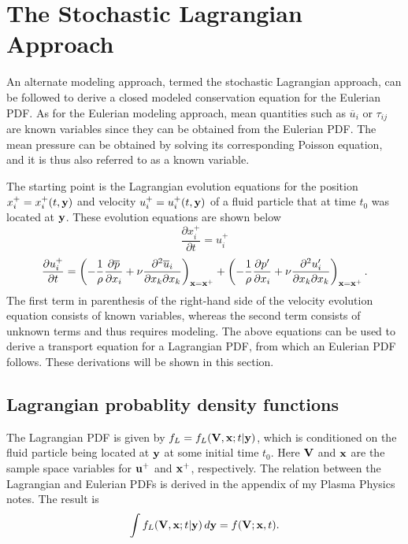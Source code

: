 \documentclass[oneside,a4paper,11pt]{report}
\newcommand{\pavg}{\overline{p}}
\newcommand{\uavg}{\overline{u}}
\newcommand{\pfluc}{p'}
\newcommand{\ufluc}{u'}
\newcommand{\rs}{\tau}          %
\begin{document}
\section{The Stochastic Lagrangian Approach}

An alternate modeling approach, termed the stochastic Lagrangian approach, can be followed to derive a closed modeled conservation equation for the Eulerian PDF. As for the Eulerian modeling approach, mean quantities such as $\uavg_i$ or $\rs_{ij}$ are known variables since they can be obtained from the Eulerian PDF. The mean pressure can be obtained by solving its corresponding Poisson equation, and it is thus also referred to as a known variable. 

The starting point is the Lagrangian evolution equations for the position $x_i^+ = x_i^+(t,\mathbf{y})$ and velocity $u_i^+ = u_i^+(t,\mathbf{y})$ of a fluid particle that at time $t_0$ was located at $\mathbf{y}$. These evolution equations are shown below 
\begin{equation}
\frac{\partial x_i^+}{\partial t} = u_i^+ 
\end{equation}
\begin{equation}
\frac{\partial u_i^+}{\partial t} = \left (-\frac{1}{\rho} \frac{\partial \pavg}{\partial x_i} + \nu \frac{\partial^2 \uavg_i}{\partial x_k \partial x_k} \right)_{\xvec = \xvec^+} + \left ( - \frac{1}{\rho} \frac{\partial \pfluc}{\partial x_i} +  \nu \frac{\partial^2 \ufluc_i}{\partial x_k \partial x_k} \right)_{\xvec = \xvec^+}.
\end{equation}
The first term in parenthesis of the right-hand side of the velocity evolution equation consists of known variables, whereas the second term consists of unknown terms and thus requires modeling. The above equations can be used to derive a transport equation for a Lagrangian PDF, from which an Eulerian PDF follows. These derivations will be shown in this section. 

\subsection{Lagrangian probablity density functions}
The Lagrangian PDF is given by $f_L = f_L(\mathbf{V},\mathbf{x};t|\mathbf{y})$, which is conditioned on the fluid particle being located at $\mathbf{y}$ at some initial time $t_0$. Here $\mathbf{V}$ and $\mathbf{x}$ are the sample space variables for $\mathbf{u}^+$ and $\mathbf{x}^+$, respectively. The relation between the Lagrangian and Eulerian PDFs is derived in the appendix of my Plasma Physics notes. The result is
\begin{equation}
    \label{eul_lag}
    \int f_L(\mathbf{V},\mathbf{x};t|\mathbf{y}) \, d\mathbf{y} = f(\mathbf{V};\mathbf{x},t).
\end{equation}
\end{document}
